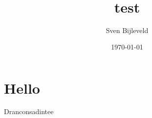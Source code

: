 \documentclass[a4paper,11pt]{article}
\title{test}
\author{Sven Bijleveld}
\date{\today}
\begin{document}
\maketitle
\tableofcontents

\begin{abstract}
\end{abstract}

\section{Hello}
Dranconsadintee
\end{document}
